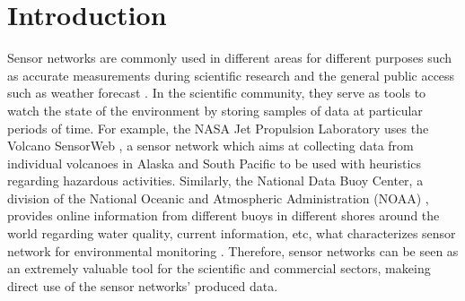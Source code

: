 


\chapter{Introduction}

Sensor networks are commonly used in different areas for different purposes
such as accurate measurements during scientific research \cite{sn-intro01} and
the general public access such as weather forecast \cite{sn-intro02}. In the
scientific community, they serve as tools to watch the state of the environment
by storing samples of data at particular periods of time. For example, the
NASA Jet Propulsion Laboratory uses the Volcano SensorWeb \cite{sn-ex02}, a
sensor network which aims at collecting data from individual volcanoes in
Alaska and South Pacific to be used with heuristics regarding hazardous
activities. Similarly, the National Data Buoy Center, a division of the
National Oceanic and Atmospheric Administration (NOAA) \cite{sn-ex03},
provides online information from different buoys in different shores around
the world regarding water quality, current information, etc, what
characterizes sensor network for environmental monitoring \cite{sn-ex01}.
Therefore, sensor networks can be seen as an extremely valuable tool
for the scientific and commercial sectors, makeing direct use of the sensor
networks' produced data.


